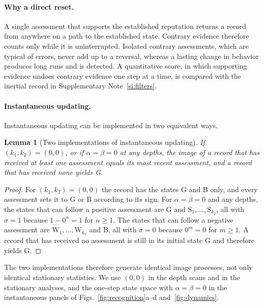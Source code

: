 \documentclass[10pt]{wlscirep}
\newcommand{\st}[1]{\mathrm{#1}}           %
\theoremstyle{plain}
\newtheorem{lemma}{Lemma}
\theoremstyle{remark}
\begin{document}
\paragraph{Why a direct reset.} A single assessment that supports the established reputation returns a record from anywhere on a path to the established state. Contrary evidence therefore counts only while it is uninterrupted. Isolated contrary assessments, which are typical of errors, never add up to a reversal, whereas a lasting change in behavior produces long runs and is detected. A quantitative score, in which supporting evidence undoes contrary evidence one step at a time, is compared with the inertial record in Supplementary Note~\ref{si:filters}.

\paragraph{Instantaneous updating.} Instantaneous updating can be implemented in two equivalent ways.

\begin{lemma}[Two implementations of instantaneous updating]\label{lem:instantaneous}
If $(k_1,k_2)=(0,0)$, or if $\alpha=\beta=0$ at any depths, the image of a record that has received at least one assessment equals its most recent assessment, and a record that has received none yields G.
\end{lemma}
\begin{proof}
For $(k_1,k_2)=(0,0)$ the record has the states G and B only, and every assessment sets it to G or B according to its sign. For $\alpha=\beta=0$ and any depths, the states that can follow a positive assessment are G and $\st S_1,\ldots,\st S_{k_2}$, all with $\sigma=1$ because $1-0^n=1$ for $n\geq1$. The states that can follow a negative assessment are $\st W_1,\ldots,\st W_{k_1}$ and B, all with $\sigma=0$ because $0^m=0$ for $m\geq1$. A record that has received no assessment is still in its initial state G and therefore yields G.
\end{proof}

The two implementations therefore generate identical image processes, not only identical stationary statistics. We use $(0,0)$ in the depth scans and in the stationary analyses, and the one-step state space with $\alpha=\beta=0$ in the instantaneous panels of Figs.~\ref{fig:recognition}a--d and~\ref{fig:dynamics}.
\end{document}
